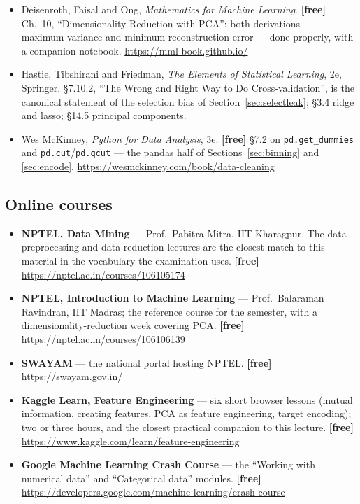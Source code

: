 \documentclass[11pt]{article}
\begin{document}
\begin{itemize}[leftmargin=*]
    \textbf{[free]} The best single book on this lecture. Ch.~5 encoding
    categorical predictors, including high cardinality and unseen levels;
    Ch.~6 engineering numeric predictors; Ch.~10 the filter/wrapper/embedded
    taxonomy; Ch.~11 greedy search, including RFE.
    \url{http://www.feat.engineering/}
  \item Deisenroth, Faisal and Ong, \emph{Mathematics for Machine Learning}.
    \textbf{[free]} Ch.~10, ``Dimensionality Reduction with PCA'': both
    derivations --- maximum variance and minimum reconstruction error --- done
    properly, with a companion notebook.
    \url{https://mml-book.github.io/}
  \item Hastie, Tibshirani and Friedman, \emph{The Elements of Statistical
    Learning}, 2e, Springer. \S7.10.2, ``The Wrong and Right Way to Do
    Cross-validation'', is the canonical statement of the selection bias of
    Section~\ref{sec:selectleak}; \S3.4 ridge and lasso; \S14.5 principal
    components.
  \item Wes McKinney, \emph{Python for Data Analysis}, 3e. \textbf{[free]}
    \S7.2 on \texttt{pd.get\_dummies} and \texttt{pd.cut}/\texttt{pd.qcut} ---
    the pandas half of Sections~\ref{sec:binning} and \ref{sec:encode}.
    \url{https://wesmckinney.com/book/data-cleaning}
\end{itemize}

\subsection*{Online courses}

\begin{sloppypar}
\begin{itemize}[leftmargin=*]
  \item \textbf{NPTEL, Data Mining} --- Prof.\ Pabitra Mitra, IIT Kharagpur.
    The data-preprocessing and data-reduction lectures are the closest match
    to this material in the vocabulary the examination uses. \textbf{[free]}
    \url{https://nptel.ac.in/courses/106105174}
  \item \textbf{NPTEL, Introduction to Machine Learning} --- Prof.\ Balaraman
    Ravindran, IIT Madras; the reference course for the semester, with a
    dimensionality-reduction week covering PCA. \textbf{[free]}
    \url{https://nptel.ac.in/courses/106106139}
  \item \textbf{SWAYAM} --- the national portal hosting NPTEL. \textbf{[free]}
    \url{https://swayam.gov.in/}
  \item \textbf{Kaggle Learn, Feature Engineering} --- six short browser
    lessons (mutual information, creating features, PCA as feature
    engineering, target encoding); two or three hours, and the closest
    practical companion to this lecture. \textbf{[free]}
    \url{https://www.kaggle.com/learn/feature-engineering}
  \item \textbf{Google Machine Learning Crash Course} --- the ``Working with
    numerical data'' and ``Categorical data'' modules. \textbf{[free]}
    \url{https://developers.google.com/machine-learning/crash-course}
\end{itemize}
\end{sloppypar}
\end{document}

